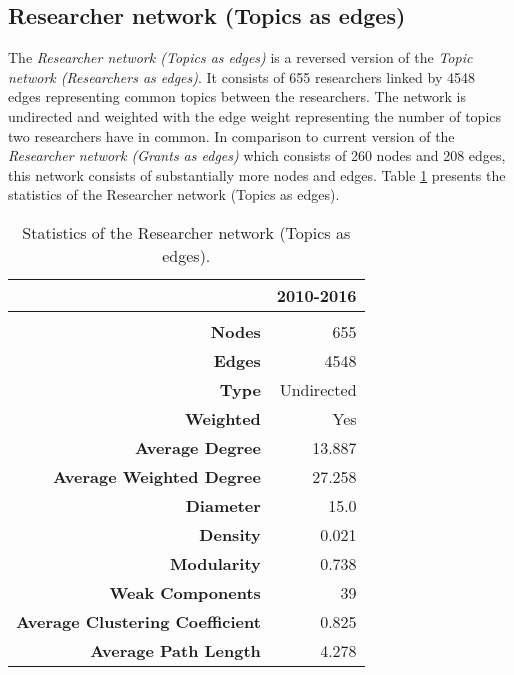 {\subsection{Researcher network (Topics as edges)}

The \textit{Researcher network (Topics as edges)} is a reversed version of the \textit{Topic network (Researchers as edges)}. It consists of 655 researchers linked by 4548 edges representing common topics between the researchers. The network is undirected and weighted with the edge weight representing the number of topics two researchers have in common. In comparison to current version of the \textit{Researcher network (Grants as edges)} which consists of 260 nodes and 208 edges, this network consists of substantially more nodes and edges. Table \ref{table:researcher_a_stats} presents the statistics of the Researcher network (Topics as edges).

\begin{table}[htbp]
\centering
\caption{Statistics of the Researcher network (Topics as edges).}
\label{table:researcher_a_stats}
\begin{tabular}{r|r}
{} & \textbf{2010-2016}\\
\hline\\
\textbf{Nodes}                          & {655}\\
\textbf{Edges}                          & {4548}\\
\textbf{Type}                           & {Undirected}\\
\textbf{Weighted}                       & {Yes}\\
\textbf{Average Degree}                 & {13.887}\\
\textbf{Average Weighted Degree}        & {27.258}\\
\textbf{Diameter}                       & {15.0}\\
\textbf{Density}                        & {0.021}\\
\textbf{Modularity}                     & {0.738}\\
\textbf{Weak Components}                & {39}\\
\textbf{Average Clustering Coefficient} & {0.825}\\
\textbf{Average Path Length}            & {4.278}\\
\end{tabular}
\end{table}

}
